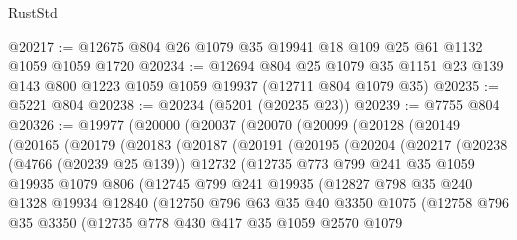 \begin{lexlean}{RustStd}
\begin{coremodule}
{\begin{coremodule}
{{{{{{{{{{{{{{{{{{{{{{{{{{{{{{{{{{{@20217 := @12675 @804 @26 @1079 @35 @19941 @18 @109 @25 @61 @1132 @1059 @1059 @1720
@20234 := @12694
    @804
    @25
    @1079
    @35
    @1151
    @23
    @139
    @143
    @800
    @1223
    @1059
    @1059
    @19937
    (@12711 @804 @1079 @35)
@20235 := @5221 @804
@20238 := @20234 (@5201 (@20235 @23))
@20239 := @7755 @804
@20326 := @19977
    (@20000
      (@20037
        (@20070
          (@20099
            (@20128
              (@20149
                (@20165
                  (@20179
                    (@20183
                      (@20187
                        (@20191
                          (@20195
                            (@20204
                              (@20217
                                (@20238
                                  (@4766 (@20239 @25 @139))
                                  @12732
                                  (@12735
                                    @773
                                    @799
                                    @241
                                    @35
                                    @1059
                                    @19935
                                    @1079
                                    @806
                                    (@12745
                                      @799
                                      @241
                                      @19935
                                      (@12827
                                        @798
                                        @35
                                        @240
                                        @1328
                                        @19934
                                        @12840
                                        (@12750
                                          @796
                                          @63
                                          @35
                                          @40
                                          @3350
                                          @1075
                                          (@12758
                                            @796
                                            @35
                                            @3350
                                            (@12735
                                              @778
                                              @430
                                              @417
                                              @35
                                              @1059
                                              @2570
                                              @1079
}}}}}}}}}}}}}}}}}}}}}}}}}}}}}}}}}}}
\end{coremodule}}
\end{coremodule}
\end{lexlean}
